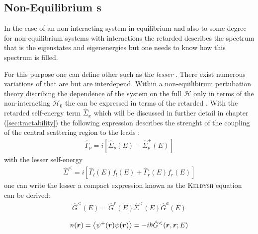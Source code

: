 \subsection{Non-Equilibrium \cgfnc s}
In the case of an non-interacting system in equilibrium and also to some degree for non-equilibrium systems with interactions the retarded \gfnc{} describes the spectrum that is the eigenstates and eigenenergies but one needs to know how this spectrum is filled.\par 
For this purpose one can define other \gfnc{} such as the \emph{lesser \gfnc{}} \cite{haug2008quantum}. There exist numerous variations of \gfnc{} that are  but are interdepend.
Within a non-equilibirum pertubation theory discribing the dependence of the system on the full \hamil{} $\mathcal{H}$ only in terms of the non-interacting \hamil{} $\mathcal{H}_0$\cite{Jauho2006} the  can be expressed in terms of the retarded \gfnc{}. With the retarded self-energy term $\hat{\Sigma}_x$ which will be discussed in further detail in chapter (\ref{sec:tractability}) the following expression describes the strenght of the coupling of the central scattering region to the leads \cite{Datta1997}:
\begin{align}
\hat{\Gamma}_p = i\left[\hat{\Sigma}_p(E)-\hat{\Sigma}_p^+(E)\right]
\end{align}
with the lesser self-energy
\begin{align}
\hat{\Sigma}^<=i\left[\hat{\Gamma}_l(E)f_l(E)+\hat{\Gamma}_r(E)f_r(E) \right]
\end{align}
one can write the lesser \gfnc{}a compact expression known as the \textsc{Keldysh} equation can be derived:
\begin{align}
\hat{G}^<(E) = \hat{G}^r(E) \hat{\Sigma}^<(E) \hat{G}^a(E)
\label{eqn:keldyshequation}
\end{align}

\begin{align}
	n(\boldsymbol{r}) = \left< \psi^+ (\boldsymbol{r}) \psi(\boldsymbol{r})\right> = -i\hbar \hat{G}^<(\boldsymbol{r},\boldsymbol{r};E)
\end{align}

